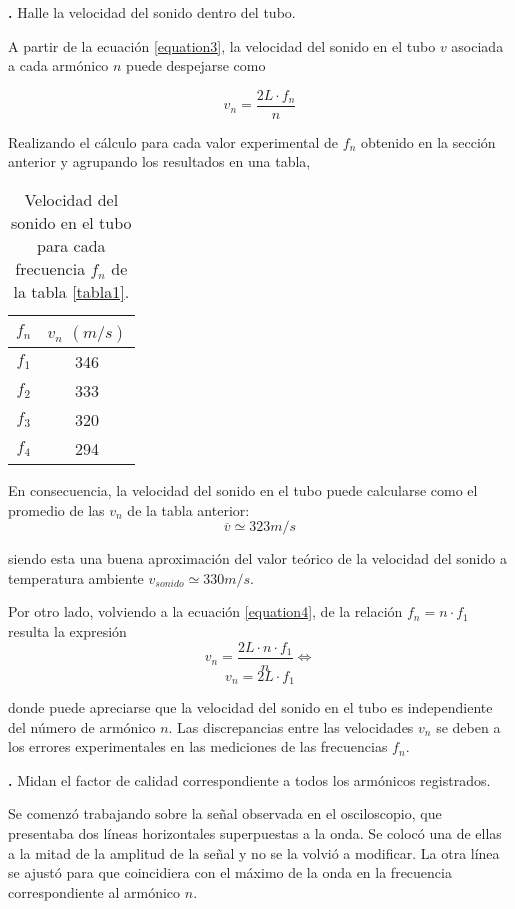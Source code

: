\documentclass[12pt, a4paper]{article}
\newcounter{step}
\newcommand{\step}[1]
{
  \par\vspace{2ex}
  \stepcounter{step}
  \noindent\textbf{\arabic{step}.} #1\par\vspace{1ex}
}
\begin{document}
\step{Halle la velocidad del sonido dentro del tubo.}

A partir de la ecuación \ref{equation3}, la velocidad del sonido en el tubo $v$ asociada a cada armónico $n$ puede despejarse como

\begin{equation}
  v_{n} = \frac{2L \cdot f_{n}}{n}
  \label{equation4}
\end{equation}

Realizando el cálculo para cada valor experimental de $f_{n}$ obtenido en la sección anterior y agrupando los resultados en una tabla,

\begin{table}[H]
    \centering
    \begin{tabular}{|c|c|}
    \hline
    \multirow{1}{2.1cm}{\centering $f_n$} 
        & $v_{n}$ $(m/s)$ \\
    \hline
    $f_1$  & 346 \\ \hline
    $f_2$  & 333 \\ \hline
    $f_3$  & 320 \\ \hline
    $f_4$  & 294  \\ \hline
    \end{tabular}
    \caption{Velocidad del sonido en el tubo para cada frecuencia $f_{n}$ de la tabla \ref{tabla1}.}
    \label{tabla2}
\end{table}

En consecuencia, la velocidad del sonido en el tubo puede calcularse como el promedio de las $v_{n}$ de la tabla anterior:
$$\overline{v} \simeq 323 m/s$$

siendo esta una buena aproximación del valor teórico de la velocidad del sonido a temperatura ambiente $v_{sonido}\simeq 330 m/s$.

Por otro lado, volviendo a la ecuación \ref{equation4}, de la relación $f_{n}=n\cdot f_{1}$ resulta la expresión
$$ v_{n} = \frac{2L \cdot n \cdot f_{1}}{n} \Longleftrightarrow $$
$$ v_{n} = 2L \cdot f_{1} $$

donde puede apreciarse que la velocidad del sonido en el tubo es independiente del número de armónico $n$. Las discrepancias entre las velocidades $v_{n}$ se deben a los errores experimentales en las mediciones de las frecuencias $f_{n}$.


\step{Midan el factor de calidad correspondiente a todos los armónicos registrados.}

Se comenzó trabajando sobre la señal observada en el osciloscopio, que presentaba dos líneas horizontales superpuestas a la onda. Se colocó una de ellas a la mitad de la amplitud de la señal y no se la  volvió a modificar. La otra línea se ajustó para que coincidiera con el máximo de la onda en la frecuencia correspondiente al armónico $n$.
\end{document}
